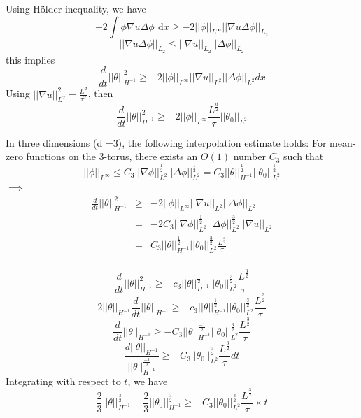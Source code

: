 \documentclass[12pt]{report}   %
\renewcommand{\leq}{\leqslant}
\renewcommand{\geq}{\geqslant}
\numberwithin{equation}{section}
\theoremstyle{plain}
\theoremstyle{definition}
\theoremstyle{remark}
\newcommand{\rmd}{\, \mathrm{d}}
\begin{document}
Using H\"{o}lder inequality, we have 
\[ -2 \int \phi \nabla u \Delta\phi  ~\rmd x \geq -2||\phi||_{L^\infty} ||\nabla u \Delta\phi ||_{L_2}\]
\[||\nabla u \Delta\phi ||_{L_2} \leq ||\nabla u||_{L_2} ||\Delta\phi ||_{L_2}\]
this implies
\[  \frac{d}{dt}||\theta||_{H^{-1}}^2 \geq  -2 || \phi ||_{L^\infty} ||\nabla u||_{L^2} ||\Delta\phi||_{L^2}  dx  \] 
Using $||\nabla u||_{L^2}^2 = \frac{L^d}{\tau^2}$, then 
\[  \frac{d}{dt}||\theta||_{H^{-1}}^2 \geq -2|| \phi ||_{L^\infty}  \frac{L^\frac{d}{2}}{\tau}||\theta_0||_{L^2}\]

In three dimensions (d =3), the following interpolation estimate holds:
For mean-zero functions on the 3-torus, there exists an $O(1)$ number $C_3$ such that 
\begin{equation}
||\phi||_{L^\infty}  \leq C_3||\nabla\phi||_{L^2}^\frac{1}{2} ||\Delta\phi||_{L^2}^\frac{1}{2} = C_3 ||\theta||_{H^{-1}}^\frac{1}{2} ||\theta_0||_{L^2}^\frac{1}{2}
\end{equation}
$\implies$ \\
\begin{eqnarray*}
 \frac{d}{dt}||\theta||_{H^{-1}}^2 &\geq&  -2 || \phi ||_{L^\infty} ||\nabla u||_{L^2} ||\Delta\phi||_{L^2}   \\
& = & -2C_3||\nabla\phi||_{L^2}^\frac{1}{2} ||\Delta\phi||_{L^2}^\frac{3}{2} ||\nabla u||_{L^2} \\
&=& C_3 ||\theta||_{H^{-1}}^\frac{1}{2} ||\theta_0||_{L^2}^\frac{3}{2} \frac{L^\frac{d}{2}}{\tau} \\
\end{eqnarray*}

\[  \frac{d}{dt}||\theta||_{H^{-1}}^2 \geq - c_3 ||\theta||_{H^{-1}}^\frac{1}{2} ||\theta_0||_{L^2}^\frac{3}{2} \frac{L^\frac{3}{2}}{\tau}\]
\[ 2||\theta||_{H^{-1}} \frac{d}{dt}||\theta||_{H^{-1}} \geq- c_3 ||\theta||_{H^{-1}}^\frac{1}{2} ||\theta_0||_{L^2}^\frac{3}{2} \frac{L^\frac{3}{2}}{\tau}\]
\begin{equation}
\frac{d}{dt}||\theta||_{H^{-1}} \geq - C_3 ||\theta||_{H^{-1}}^\frac{-1}{2} ||\theta_0||_{L^2}^\frac{3}{2} \frac{L^\frac{3}{2}}{\tau} \label{eq:ens-decay}
\end{equation}
\[ \frac{d||\theta||_{H^{-1}}}{||\theta||_{H^{-1}}^\frac{-1}{2}} \geq - C_3  ||\theta_0||_{L^2}^\frac{3}{2} \frac{L^\frac{3}{2}}{\tau} dt \]
Integrating with respect to $t$, we have
\[ \frac{2}{3}||\theta||_{H^{-1}}^\frac{3}{2} -  \frac{2}{3}||\theta_0||_{H^{-1}}^\frac{3}{2} \geq - C_3  ||\theta_0||_{L^2}^\frac{3}{2} \frac{L^\frac{3}{2}}{\tau} \times  t \]
\end{document}
